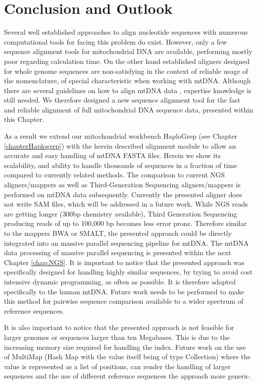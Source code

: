 \section{Conclusion and Outlook}
Several well established approaches to align nucleotide sequences with numerous computational tools for facing this problem do exist. However, only a few sequence alignment tools for mitochondrial DNA are available, performing mostly poor regarding calculation time. On the other hand established aligners designed for whole genome sequences are non-satisfying in the context of reliable usage of the nomenclature, of special characteristic when working with mtDNA. Although there are several guidelines on how to align mtDNA data \cite{Wilson2002,Bandelt2008,Polanskey2010}, expertise knowledge is still needed. We therefore designed a new sequence alignment tool for the fast and reliable alignment of full mitochondrial DNA sequence data, presented within this Chapter. 

As a result we extend our mitochondrial workbench HaploGrep (see Chapter \ref{chapterHaplogrep}) with the herein described alignment module to allow an accurate and easy handling of mtDNA FASTA files. Herein we show its scalability, and ability to handle thousands of sequences in a fraction of time compared to currently related methods. The comparison to current NGS aligners/mappers as well as Third-Generation Sequencing aligners/mappers is performed on mtDNA data subsequently. Currently the presented aligner does not write SAM files, which will be addressed in a future work. While NGS reads are getting longer (300bp chemistry available), Third Generation Sequencing producing reads of up to 100,000 bp becomes less error prone. Therefore similar to the mappers BWA or SMALT, the presented approach could be directly integrated into an massive parallel sequencing pipeline for mtDNA. 
The mtDNA data processing of massive parallel sequencing is presented within the next Chapter \ref{chap:NGS}. It is important to notice that the presented approach was specifically designed for handling highly similar sequences, by trying to avoid cost intensive dynamic programming, as often as possible. It is therefore adapted specifically to the human mtDNA. Future work needs to be performed to make this method for pairwise sequence comparison available to a wider spectrum of reference sequences. 

It is also important to notice that the presented approach is not feasible for larger genomes or sequences larger than ten Megabases. This is due to the increasing memory size required for handling the index. Future work on the use of MultiMap (Hash Map with the value itself being of type Collection) where the value is represented as a list of positions, can render the handling of larger sequences and the use of different reference sequences  the approach more generic. 




